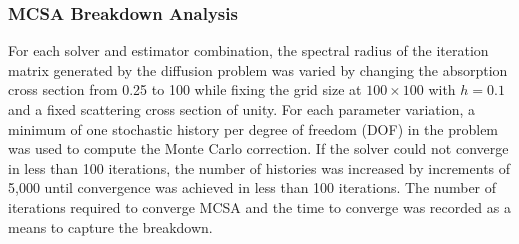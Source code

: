 \subsubsection{MCSA Breakdown Analysis}
\label{subsubsec:breakdown_analysis}
For each solver and estimator combination, the spectral radius of the
iteration matrix generated by the diffusion problem was varied by
changing the absorption cross section from 0.25 to 100 while fixing
the grid size at $100 \times 100$ with $h = 0.1$ and a fixed
scattering cross section of unity. For each parameter variation, a
minimum of one stochastic history per degree of freedom (DOF) in the
problem was used to compute the Monte Carlo correction. If the solver
could not converge in less than 100 iterations, the number of
histories was increased by increments of 5,000 until convergence was
achieved in less than 100 iterations. The number of iterations
required to converge MCSA and the time to converge was recorded as a
means to capture the breakdown.

